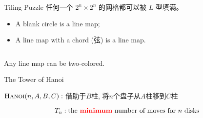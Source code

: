 
\begin{frame}{}
  \begin{exampleblock}{Tiling Puzzle}
    任何一个 $2^{n} \times 2^{n}$ 的网格都可以被 $L$ 型填满。
  \end{exampleblock}


  \pause
  \vspace{-1.50cm}
  \begin{center}
  \end{center}
\end{frame}

\begin{frame}{}
  \begin{definition}
    \begin{itemize}
      \item A blank circle is a line map;
      \item A line map with a chord (弦) is a line map.
    \end{itemize}
  \end{definition}

  \begin{columns}
  \end{columns}

  \pause
  \vspace{-0.30cm}
  \begin{theorem}
    Any line map can be two-colored.
  \end{theorem}
\end{frame}

\begin{frame}{}
  \begin{exampleblock}{The Tower of Hanoi}

    \vspace{0.30cm}
    \begin{center}
      $\textsc{Hanoi}(n, A, B, C):$ 借助于$B$柱, 将$n$个盘子从$A$柱移到$C$柱
    \end{center}
  \end{exampleblock}

  \pause
  \[
    T_{n}: \text{the \textcolor{red}{\bf minimum} number of moves for $n$ disks}
  \]
\end{frame}

